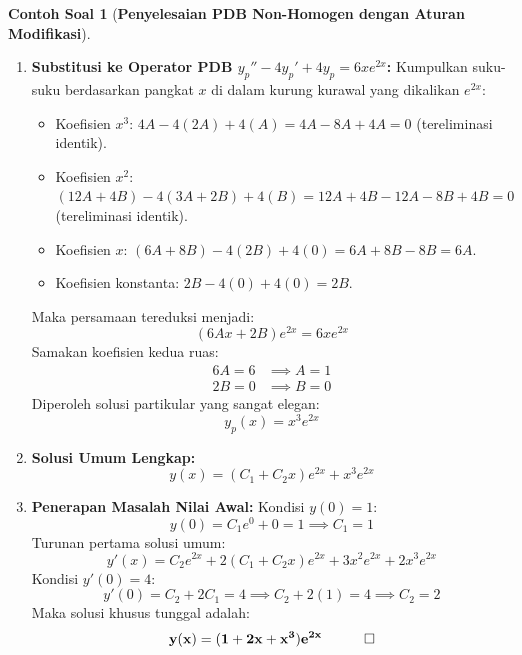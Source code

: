\documentclass[11pt,a4paper]{article}
\theoremstyle{definition}
\newtheorem{example}{Contoh Soal}[section]
\begin{document}
\begin{example}[\textbf{Penyelesaian PDB Non-Homogen dengan Aturan Modifikasi}]
\begin{enumerate}[leftmargin=*]
    \item \textbf{Substitusi ke Operator PDB $y_p'' - 4y_p' + 4y_p = 6x e^{2x}$:}
    Kumpulkan suku-suku berdasarkan pangkat $x$ di dalam kurung kurawal yang dikalikan $e^{2x}$:
    \begin{itemize}
        \item Koefisien $x^3$: $4A - 4(2A) + 4(A) = 4A - 8A + 4A = 0$ (tereliminasi identik).
        \item Koefisien $x^2$: $(12A + 4B) - 4(3A + 2B) + 4(B) = 12A + 4B - 12A - 8B + 4B = 0$ (tereliminasi identik).
        \item Koefisien $x$: $(6A + 8B) - 4(2B) + 4(0) = 6A + 8B - 8B = 6A$.
        \item Koefisien konstanta: $2B - 4(0) + 4(0) = 2B$.
    \end{itemize}
    Maka persamaan tereduksi menjadi:
    \begin{equation*}
        (6A x + 2B) e^{2x} = 6x e^{2x}
    \end{equation*}
    Samakan koefisien kedua ruas:
    \begin{align*}
        6A = 6 &\implies A = 1 \\
        2B = 0 &\implies B = 0
    \end{align*}
    Diperoleh solusi partikular yang sangat elegan:
    \begin{equation*}
        y_p(x) = x^3 e^{2x}
    \end{equation*}

    \item \textbf{Solusi Umum Lengkap:}
    \begin{equation*}
        y(x) = (C_1 + C_2 x) e^{2x} + x^3 e^{2x}
    \end{equation*}

    \item \textbf{Penerapan Masalah Nilai Awal:}
    Kondisi $y(0) = 1$:
    \begin{equation*}
        y(0) = C_1 e^0 + 0 = 1 \implies C_1 = 1
    \end{equation*}
    Turunan pertama solusi umum:
    \begin{equation*}
        y'(x) = C_2 e^{2x} + 2(C_1 + C_2 x) e^{2x} + 3x^2 e^{2x} + 2x^3 e^{2x}
    \end{equation*}
    Kondisi $y'(0) = 4$:
    \begin{equation*}
        y'(0) = C_2 + 2C_1 = 4 \implies C_2 + 2(1) = 4 \implies C_2 = 2
    \end{equation*}
    Maka solusi khusus tunggal adalah:
    \begin{equation*}
        \mathbf{y(x) = (1 + 2x + x^3) e^{2x}} \quad \qed
    \end{equation*}
\end{enumerate}
\end{example}
\end{document}
